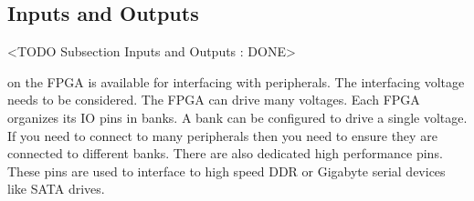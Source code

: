 \subsection{Inputs and Outputs}
	<TODO Subsection Inputs and Outputs : DONE>

 on the \ac{FPGA} is available for interfacing with peripherals. The interfacing voltage needs to be considered. The \ac{FPGA} can drive many voltages. Each \ac{FPGA} organizes its \ac{IO} pins in banks. A bank can be configured to drive a single voltage. If you need to connect to many peripherals then you need to ensure they are connected to different banks. There are also dedicated high performance pins. These pins are used to interface to high speed \ac{DDR} or Gigabyte serial devices like \ac{SATA} drives. 